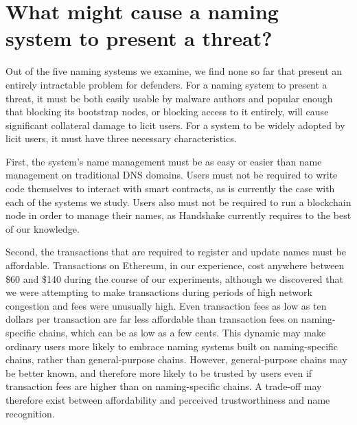 \documentclass[conference]{IEEEtran}
\begin{document}
\section{What might cause a naming system to present a threat?}

Out of the five naming systems we examine, we find none so far that present an 
entirely intractable problem for defenders. For a naming system to present a  
threat, it must be both easily usable by malware authors and 
popular enough that blocking its bootstrap nodes, or blocking 
access to it entirely, will cause significant collateral damage to licit users.
For a system to be widely adopted by licit users, it must have three necessary characteristics. 

First, the system's name management must be as 
easy or easier than name management on traditional DNS domains. Users must not be required to write 
code themselves to interact with smart contracts, as is currently the case with each of the systems we 
study. Users also must not be required to run a blockchain node in order to manage their names, as 
Handshake currently requires to the best of our knowledge.

Second, the transactions that are required to register and update names must be affordable. 
Transactions on Ethereum, in our experience, cost anywhere between \$60 and \$140 during the course of 
our experiments, although we discovered that we were attempting to make transactions during periods of 
high network congestion and fees were unusually high. Even transaction fees as low as ten dollars per 
transaction are far less affordable than transaction fees on naming-specific chains, which can be as 
low as a few cents. This dynamic may make ordinary users more likely to embrace naming systems built 
on naming-specific chains, rather than general-purpose chains. However, general-purpose chains may be 
better known, and therefore more likely to be trusted by users even if transaction fees are higher 
than on naming-specific chains. A trade-off may therefore exist between affordability and perceived 
trustworthiness and name recognition. 
\end{document}
